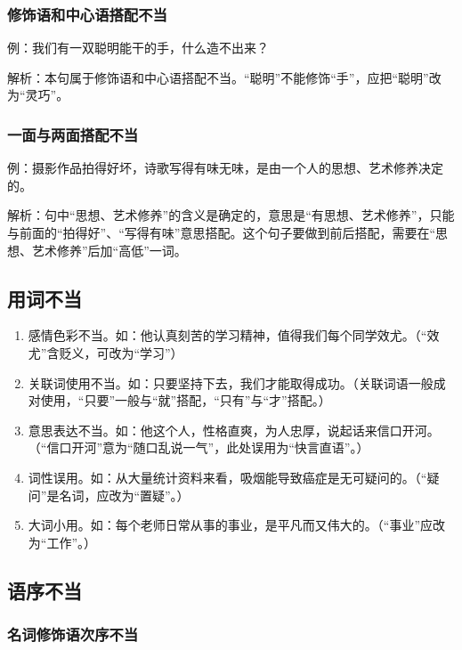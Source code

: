 \subsubsection{修饰语和中心语搭配不当}

例：我们有一双聪明能干的手，什么造不出来？

解析：本句属于修饰语和中心语搭配不当。“聪明”不能修饰“手”，应把“聪明”改为“灵巧”。

\subsubsection{一面与两面搭配不当}

例：摄影作品拍得好坏，诗歌写得有味无味，是由一个人的思想、艺术修养决定的。

解析：句中“思想、艺术修养”的含义是确定的，意思是“有思想、艺术修养”，只能与前面的“拍得好”、“写得有味”意思搭配。这个句子要做到前后搭配，需要在“思想、艺术修养”后加“高低”一词。

\subsection{用词不当}

\begin{enumerate}[leftmargin=*]
    \item 感情色彩不当。如：他认真刻苦的学习精神，值得我们每个同学效尤。（“效尤”含贬义，可改为“学习”）
    \item 关联词使用不当。如：只要坚持下去，我们才能取得成功。（关联词语一般成对使用，“只要”一般与“就”搭配，“只有”与“才”搭配。）
    \item 意思表达不当。如：他这个人，性格直爽，为人忠厚，说起话来信口开河。（“信口开河”意为“随口乱说一气”，此处误用为“快言直语”。）
    \item 词性误用。如：从大量统计资料来看，吸烟能导致癌症是无可疑问的。（“疑问”是名词，应改为“置疑”。）
    \item 大词小用。如：每个老师日常从事的事业，是平凡而又伟大的。（“事业”应改为“工作”。）
\end{enumerate}

\subsection{语序不当}

\subsubsection{名词修饰语次序不当}

